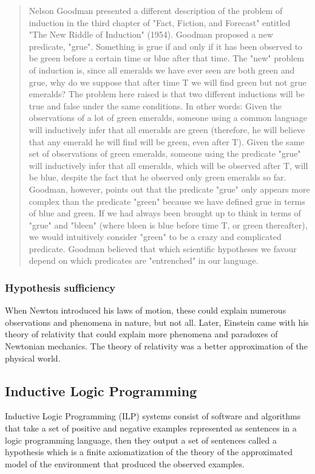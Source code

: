 \begin{quote}
Nelson Goodman presented a different description of the problem of induction  in the third chapter of "Fact, Fiction, and Forecast" entitled "The New Riddle of Induction" (1954). Goodman proposed a new predicate, "grue". Something is grue if and only if it has been observed to be green before a certain time or blue after that time. The "new" problem of induction is, since all emeralds we have ever seen are both green and grue, why do we suppose that after time T we will find green but not grue emeralds? The problem here raised is that two different inductions will be true and false under the same conditions. In other words:
Given the observations of a lot of green emeralds, someone using a common language will inductively infer that all emeralds are green (therefore, he will believe that any emerald he will find will be green, even after T).
Given the same set of observations of green emeralds, someone using the predicate "grue" will inductively infer that all emeralds, which will be observed after T, will be blue, despite the fact that he observed only green emeralds so far.
Goodman, however, points out that the predicate "grue" only appears more complex than the predicate "green" because we have defined grue in terms of blue and green. If we had always been brought up to think in terms of "grue" and "bleen" (where bleen is blue before time T, or green thereafter), we would intuitively consider "green" to be a crazy and complicated predicate. Goodman believed that which scientific hypotheses we favour depend on which predicates are "entrenched" in our language.
\end{quote}

\subsubsection{Hypothesis sufficiency}
When Newton introduced his laws of motion, these could explain numerous observations and phenomena in nature, but not all. Later, Einstein came with his theory of relativity that could explain more phenomena and paradoxes of Newtonian mechanics. The theory of relativity was a better approximation of the physical world.

\subsection{Inductive Logic Programming}
Inductive Logic Programming (ILP) systems consist of software and algorithms that take a set of positive and negative examples represented as sentences in a logic programming language, then they output a set of sentences called a hypothesis which is a finite axiomatization of the theory of the approximated model of the environment that produced the observed examples.

